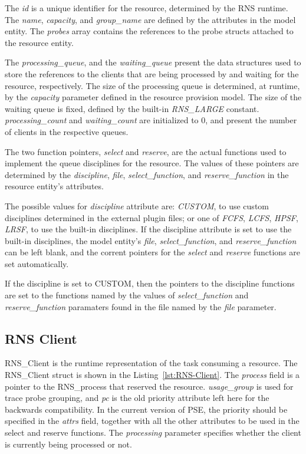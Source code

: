 

The \emph{id} is a unique identifier for the resource, determined by the RNS runtime. The \emph{name}, \emph{capacity}, and \emph{group\_name} are defined by the attributes in the model entity. The \emph{probes} array contains the references to the probe structs attached to the resource entity.

The \emph{processing\_queue}, and the \emph{waiting\_queue} present the data structures used to store the references to the clients that are being processed by and waiting for the resource, respectively. The size of the processing queue is determined, at runtime, by the \emph{capacity} parameter defined in the resource provision model. The size of the waiting queue is fixed, defined by the built-in \emph{RNS\_LARGE} constant. \emph{processing\_count} and \emph{waiting\_count} are initialized to 0, and present the number of clients in the respective queues.

The two function pointers, \emph{select} and \emph{reserve}, are the actual functions used to implement the queue disciplines for the resource. The values of these pointers are determined by the \emph{discipline}, \emph{file}, \emph{select\_function}, and \emph{reserve\_function} in the resource entity's attributes.

The possible values for \emph{discipline} attribute are: \emph{CUSTOM}, to use custom disciplines determined in the external plugin files; or one of \emph{FCFS}, \emph{LCFS}, \emph{HPSF}, \emph{LRSF}, to use the built-in disciplines. If the discipline attribute is set to use the built-in disciplines, the model entity's \emph{file}, \emph{select\_function}, and \emph{reserve\_function} can be left blank, and the corrent pointers for the \emph{select} and \emph{reserve} functions are set automatically.

If the discipline is set to CUSTOM, then the pointers to the discipline functions are set to the functions named by the values of \emph{select\_function} and \emph{reserve\_function} paramaters found in the file named by the \emph{file} parameter.

\subsection{RNS Client}
RNS\_Client is the runtime representation of the task consuming a resource. The RNS\_Client struct is shown in the Listing~\ref{lst:RNS-Client}. The \emph{process} field is a pointer to the RNS\_process that reserved the resource. \emph{usage\_group} is used for trace probe grouping, and \emph{pc} is the old priority attribute left here for the backwards compatibility. In the current version of PSE, the priority should be specified in the \emph{attrs} field, together with all the other attributes to be used in the select and reserve functions. The \emph{processing} parameter specifies whether the client is currently being processed or not.

